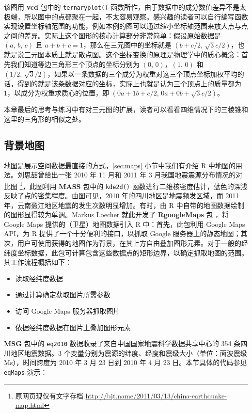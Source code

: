 \documentclass[
  b5paper,
  UTF8,twoside]{book}
\providecommand{\tightlist}{%
  \setlength{\itemsep}{0pt}\setlength{\parskip}{0pt}}
\begin{document}
该图用 \textbf{vcd} 包中的 \texttt{ternaryplot()} 函数所作，由于数据中的成分数值差异不是太极端，所以图中的点都聚在一起，不太容易观察。感兴趣的读者可以自行编写函数实现设置坐标轴范围的功能，例如本例的图可以通过缩小坐标轴范围来放大点与点之间的差异。实际上这个图形的核心计算部分非常简单：假设原始数据是 \((a,\,b,\,c)\) 且 \(a+b+c=1\)，那么在三元图中的坐标就是 \((b+c/2,\,\sqrt{3}c/2)\)，也就是说三元图本质上就是散点图。这个坐标变换的原理是物理学中的质心概念：首先我们知道等边三角形三个顶点的坐标分别为 \((0,\,0)\)，\((1,\,0)\) 和 \((1/2,\,\sqrt{3}/2)\)，如果以一条数据的三个成分为权重对这三个顶点坐标加权平均的话，得到的就是该条数据对应的坐标，实际上也就是认为三个顶点上的质量都为 1，以成分为权重求质心的位置，即 \((0a+1b+c/2,\,0a+0b+\sqrt{3}c/2)\)。

本章最后的思考与练习中有对三元图的扩展，读者可以看看四维情况下的三棱锥和这里的三角形的相似之处。

\subsection{背景地图}\label{ux80ccux666fux5730ux56fe}

地图是展示空间数据最直接的方式，\ref{sec:maps} 小节中我们有介绍 R 中地图的用法。刘思喆曾给出一张 2010 年 11 月和 2011 年 3 月我国地震震源分布情况的对比图 \footnote{原网页现仅有文字存档 \url{http://bjt.name/2011/03/13/china-earthquake-map.html}}，此图利用 \textbf{MASS} 包中的 \texttt{kde2d()} 函数进行二维核密度估计，蓝色的深浅反映了点的密集程度。由图可见，2010 年的四川地区是地震频发区域，而 2011 年，云南盈江地区地震的发生次数明显增加。有时，由 R 中自带的地图数据绘制的图形显得较为单调。Markus Loecher 就此开发了 \textbf{RgoogleMaps} 包 \citep{RgoogleMaps}，将 Google Maps 提供的（卫星）地图数据引入 R 中：首先，此包利用 Google Maps API，为 R 提供了一个十分便利的接口，以抓取 Google 服务器上的静态地图；其次，用户可使用获得的地图作为背景，在其上方自由叠加图形元素。对于一般的经纬度坐标数据，此包可计算包含这些数据点的矩形边界，以确定抓取地图的范围。其工作流程概括如下：

\begin{itemize}
\tightlist
\item
  读取经纬度数据
\item
  通过计算确定获取图片所需参数
\item
  访问 Google Maps 服务器抓取图片
\item
  依据经纬度数据在图片上叠加图形元素
\end{itemize}

\textbf{MSG} 包中的 \texttt{eq2010} 数据收录了来自中国国家地震科学数据共享中心的 354 条四川地区地震数据。3 个变量分别为震源的纬度、经度和震级大小（单位：面波震级 Ms），时间跨度为 2010 年 3 月 23 日到 2010 年 4 月 23 日。本节具体的代码参见 \texttt{eqMaps} 演示：
\end{document}
